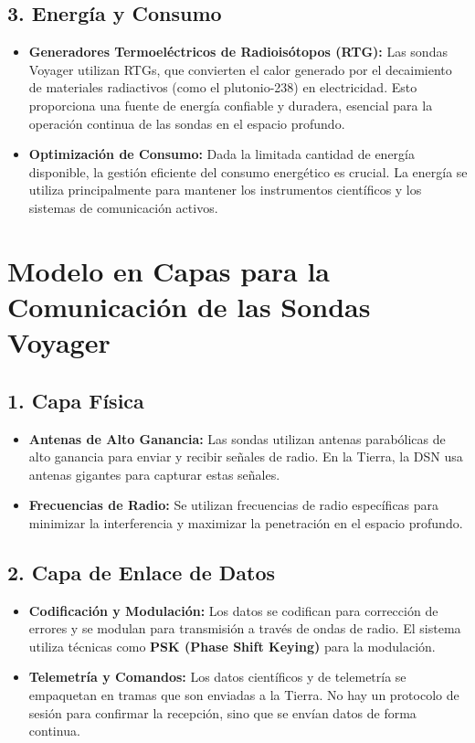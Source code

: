 \documentclass[12pt]{report}
\begin{document}
\subsection*{3. Energía y Consumo}
\begin{itemize}
	\item \textbf{Generadores Termoeléctricos de Radioisótopos (RTG):} Las sondas Voyager utilizan RTGs, que convierten el calor generado por el decaimiento de materiales radiactivos (como el plutonio-238) en electricidad. Esto proporciona una fuente de energía confiable y duradera, esencial para la operación continua de las sondas en el espacio profundo.
	\item \textbf{Optimización de Consumo:} Dada la limitada cantidad de energía disponible, la gestión eficiente del consumo energético es crucial. La energía se utiliza principalmente para mantener los instrumentos científicos y los sistemas de comunicación activos.
\end{itemize}

\section*{Modelo en Capas para la Comunicación de las Sondas Voyager}

\subsection*{1. Capa Física}
\begin{itemize}
	\item \textbf{Antenas de Alto Ganancia:} Las sondas utilizan antenas parabólicas de alto ganancia para enviar y recibir señales de radio. En la Tierra, la DSN usa antenas gigantes para capturar estas señales.
	\item \textbf{Frecuencias de Radio:} Se utilizan frecuencias de radio específicas para minimizar la interferencia y maximizar la penetración en el espacio profundo.
\end{itemize}

\subsection*{2. Capa de Enlace de Datos}
\begin{itemize}
	\item \textbf{Codificación y Modulación:} Los datos se codifican para corrección de errores y se modulan para transmisión a través de ondas de radio. El sistema utiliza técnicas como \textbf{PSK (Phase Shift Keying)} para la modulación.
	\item \textbf{Telemetría y Comandos:} Los datos científicos y de telemetría se empaquetan en tramas que son enviadas a la Tierra. No hay un protocolo de sesión para confirmar la recepción, sino que se envían datos de forma continua.
\end{itemize}
\end{document}
